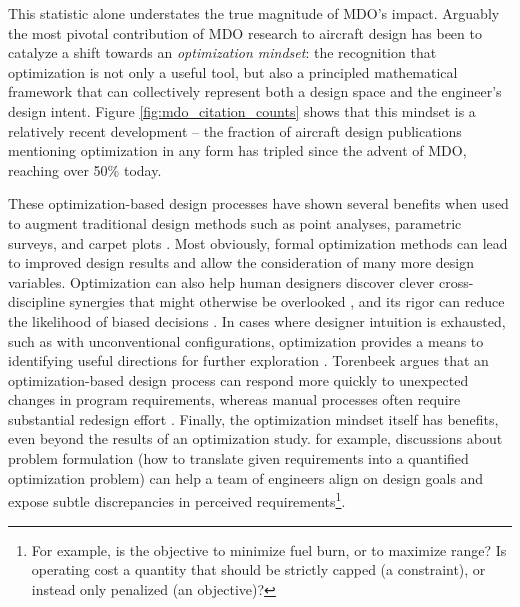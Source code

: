 This statistic alone understates the true magnitude of MDO's impact. Arguably the most pivotal contribution of MDO research to aircraft design has been to catalyze a shift towards an \textit{optimization mindset}: the recognition that optimization is not only a useful tool, but also a principled mathematical framework that can collectively represent both a design space and the engineer's design intent. Figure \ref{fig:mdo_citation_counts} shows that this mindset is a relatively recent development -- the fraction of aircraft design publications mentioning optimization in any form has tripled since the advent of MDO, reaching over 50\% today.

These optimization-based design processes have shown several benefits when used to augment traditional design methods such as point analyses, parametric surveys, and carpet plots \cite{torenbeek_advanced_2013, walton_cd_2020}. Most obviously, formal optimization methods can lead to improved design results and allow the consideration of many more design variables. Optimization can also help human designers discover clever cross-discipline synergies that might otherwise be overlooked \cite{drela_pros_1998}, and its rigor can reduce the likelihood of biased decisions \cite{torenbeek_advanced_2013}. In cases where designer intuition is exhausted, such as with unconventional configurations, optimization provides a means to identifying useful directions for further exploration \cite{drela_pros_1998}. Torenbeek argues that an optimization-based design process can respond more quickly to unexpected changes in program requirements, whereas manual processes often require substantial redesign effort \cite{torenbeek_advanced_2013}. Finally, the optimization mindset itself has benefits, even beyond the results of an optimization study. for example, discussions about problem formulation (how to translate given requirements into a quantified optimization problem) can help a team of engineers align on design goals and expose subtle discrepancies in perceived requirements\footnote{For example, is the objective to minimize fuel burn, or to maximize range? Is operating cost a quantity that should be strictly capped (a constraint), or instead only penalized (an objective)?}.

